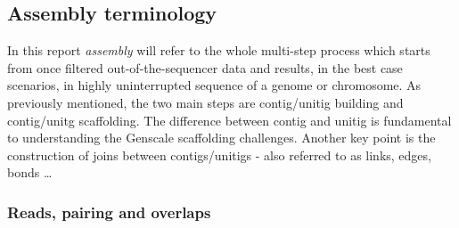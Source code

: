 \documentclass[12pt, twocolumn]{article}
\begin{document}
\subsection{Assembly terminology}\label{sec:assterm}
In this report \textit{assembly} will refer to the whole multi-step process which starts from once filtered out-of-the-sequencer data and results, in the best case scenarios, in  highly uninterrupted sequence of a genome or chromosome. As previously mentioned, the two main steps are contig/unitig building and contig/unitg scaffolding. The difference between contig and unitig is fundamental to understanding the Genscale scaffolding challenges. Another key point is the construction of joins between contigs/unitigs - also referred to as links, edges, bonds \ldots 
\subsubsection{Reads, pairing and overlaps} \label{sec:rpao}
\end{document}
